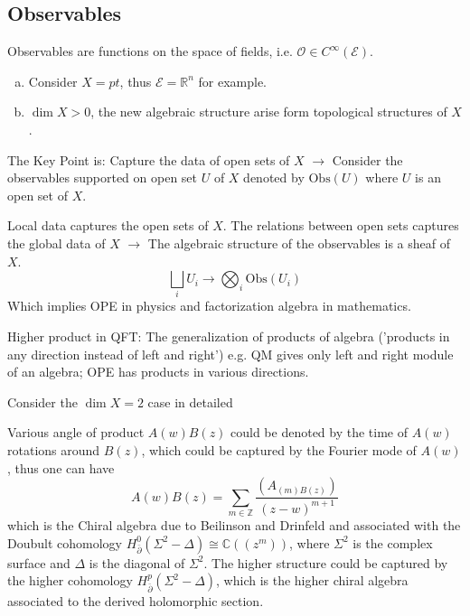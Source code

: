 \documentclass[10pt]{article}
\begin{document}
\subsection{Observables}

Observables are functions on the space of fields, i.e. $ \mathcal{O} \in C^{\infty }(\mathcal{E})$.

\begin{example}
  \begin{enumerate}[(a)]
    \item   Consider $ X = pt$, thus $ \mathcal{E} = \mathbb{R}^{n}$ for example.
    \item $ \dim X > 0$, the new algebraic structure arise form topological structures of $ X$.
  \end{enumerate}
\end{example}

The Key Point is: Capture the data of open sets of $ X$ $\longrightarrow$ Consider the observables supported on open set $ U$  of $ X$ denoted by $ \mathrm{Obs}(U)$ where $ U$ is an open set of $ X$.

Local data captures the open sets of $ X$. The relations between open sets captures the global data of $ X$ $\longrightarrow$ The algebraic structure of the observables is a sheaf of $ X$.
\begin{equation*}
  \bigsqcup_{i} U_{i} \longrightarrow \bigotimes_{i} \mathrm{Obs}(U_i)
\end{equation*}
Which implies OPE in physics and factorization algebra in mathematics.

Higher product in QFT: The generalization of products of algebra ('products in any direction instead of left and right') e.g. QM gives only left and right module of an algebra; OPE has products in various directions.

Consider the $\dim X = 2$ case in detailed
\begin{example}
  Various angle of product $ A(w) B(z)$  could be denoted by the time of $ A(w)$ rotations around $ B(z)$, which could be captured by the Fourier mode of $ A(w)$, thus one can have
  \begin{equation*}
    A(w) B(z) = \sum_{m \in \mathbb{Z}} \frac{( A_{(m) B(z)})}{(z - w)^{m+1}}
  \end{equation*}
  which is the Chiral algebra due to Beilinson and Drinfeld and associated with the Doubult cohomology $ H^{0}_{\bar{ \partial }}(\Sigma^{2} - \Delta) \cong \mathbb{C}((z^{m}))$, where $ \Sigma^{2}$ is the complex surface and $ \Delta$ is the diagonal of $ \Sigma^{2}$. The higher structure could be captured by the higher cohomology $ H^{p}_{\bar{ \partial }}(\Sigma^{2} - \Delta)$, which is the higher chiral algebra associated to the derived holomorphic section.
\end{example}
\end{document}
